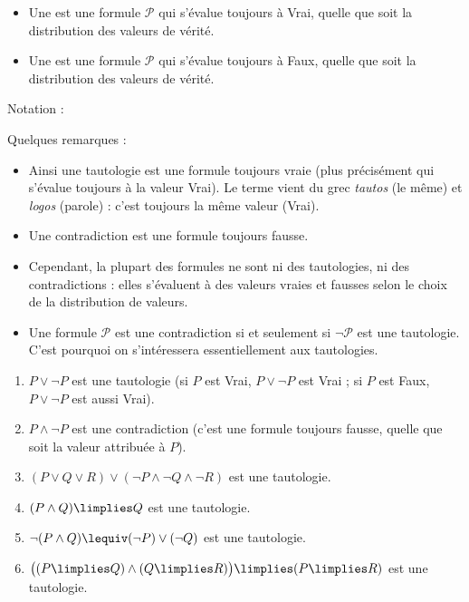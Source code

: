 \documentclass[11pt,class=report,crop=false]{standalone}
\begin{document}
\begin{definition}
	\sauteligne
	\begin{itemize}
		\item Une  est une formule $\mathcal{P}$ qui s'évalue toujours à Vrai, quelle que soit la distribution des valeurs de vérité.
		
		\item Une  est une formule $\mathcal{P}$ qui s'évalue toujours à Faux, quelle que soit la distribution des valeurs de vérité.
	\end{itemize}
\end{definition}

Notation :

Quelques remarques : 
\begin{itemize}
	\item Ainsi une tautologie est une formule toujours vraie (plus précisément qui s'évalue toujours à la valeur Vrai). 
	Le terme vient du grec \emph{tautos} (le même) et \emph{logos} (parole) : c'est toujours la même valeur (Vrai).
	\item Une contradiction est une formule toujours fausse. 
	\item Cependant, la plupart des formules ne sont ni des tautologies, ni des contradictions : elles s'évaluent à des valeurs vraies et fausses selon le choix de la distribution de valeurs. 
	\item Une formule $\mathcal{P}$ est une contradiction si et seulement si $\lnot\mathcal{P}$ est une tautologie. C'est pourquoi on s'intéressera essentiellement aux tautologies.
\end{itemize}

\begin{exemple}
	\sauteligne
	\begin{enumerate}
		\item $P \lor \lnot P$ est une tautologie (si $P$ est Vrai, $P \lor \lnot P$ est Vrai ; si $P$ est Faux, $P \lor \lnot P$ est aussi Vrai).
		
		\item $P \land \lnot P$ est une contradiction (c'est une formule toujours fausse, quelle que soit la valeur attribuée à $P$).
		
		\item $(P \lor Q \lor R) \lor (\lnot P \land \lnot Q \land \lnot R)$ est une tautologie.
		
		\item $(P \land Q) \limplies Q$ est une tautologie.
		
		\item $\lnot(P \land Q) \lequiv (\lnot P) \lor (\lnot Q)$ est une tautologie.
		
		\item $\big( (P \limplies Q) \land (Q \limplies R) \big) \limplies (P \limplies R)$ est une tautologie.
	\end{enumerate}
\end{exemple}	
\end{document}
